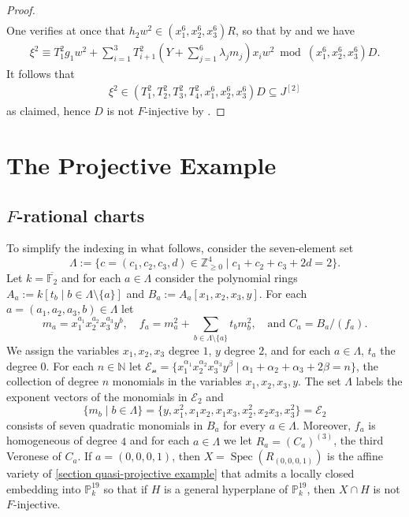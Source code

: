 \documentclass[reqno,11pt]{amsart}
\makeatletter
\numberwithin{equation}{section}
\theoremstyle{definition}
\theoremstyle{definition}
\theoremstyle{definition}
\theoremstyle{remark}
\newcommand{\Spec}{\operatorname{Spec}}
\newcommand{\NN}{\mathbb{N}}
\newcommand{\Z}{\mathbb{Z}}
\newcommand{\F}{\mathbb{F}}
\newcommand{\PP}{\mathbb{P}}
\renewcommand*{\eqref}[1]{%
  \hyperref[{#1}]{\textup{\tagform@{\ref*{#1}}}}%
}
\makeatother
\begin{document}
\begin{proof}
\begin{align*}
\end{align*}
One verifies at once that $h_2 w^2\in (x_1^6,x_2^6,x_3^6)R$, so that by \eqref{eq:xi-h1} and \eqref{eq:i-not-j} we have
\begin{align*}
    \xi^2\equiv T_1^2 g_1w^2+\sum\limits_{i=1}^3 T_{i+1}^2\left(Y+\sum\limits_{j=1}^6 \lambda_j m_j\right)x_i w^2 \bmod (x_1^6,x_2^6,x_3^6)D.
\end{align*}
It follows that
\begin{align*}
    \xi^2\in (T_1^2,T_2^2,T_3^2,T_4^2,x_1^6,x_2^6,x_3^6)D\subseteq J^{[2]}
\end{align*}
as claimed, hence $D$ is not $F$-injective by \cite[Corollary 3.9]{QS17}.
\end{proof}

\section{The Projective Example}\label{sec: projective}


\subsection{\texorpdfstring{$F$}{F}-rational charts}\label{section affine charts}

To simplify the indexing in what follows, consider the seven-element set $$\Lambda:=\{c=(c_1,c_2,c_3,d)\in\Z_{\geq 0}^4\mid c_1+c_2+c_3+2d=2\}.$$ Let $k=\overline{\F_2}$ and for each $a\in \Lambda$ consider the polynomial rings $A_a:=k[t_b\mid b\in \Lambda\setminus\{a\}]$ and $B_a:=A_a[x_1,x_2,x_3,y]$. For each $a=(a_1,a_2,a_3,b)\in \Lambda$ let 
\[
m_a = x_1^{a_1}x_2^{a_2}x_3^{a_3}y^b,\quad f_a = m_a^2 + \sum_{b\in\Lambda\setminus\{a\}}t_bm_b^2,\quad \mbox{and } C_a = B_a/(f_a).
\]
We assign the variables $x_1,x_2,x_3$ degree $1$, $y$ degree $2$, and for each $a\in\Lambda$, $t_a$ the degree $0$. For each $n\in\NN$ let $\mathcal{E_n} = \{x_1^{\alpha_1}x_2^{\alpha_2}x_3^{\alpha_3}y^{\beta}\mid \alpha_1+\alpha_2+\alpha_3+2\beta = n\}$, the collection of degree $n$ monomials in the variables $x_1,x_2,x_3,y$. The set $\Lambda$ labels the exponent vectors of the monomials in $\mathcal{E}_2$ and
\[
\{m_b\mid b\in\Lambda\} = \{y,x_1^2,x_1x_2,x_1x_3,x_2^2,x_2x_3,x_3^2\} = \mathcal{E}_2
\]
consists of seven quadratic monomials in $B_a$ for every $a\in\Lambda$. Moreover, $f_a$ is homogeneous of degree $4$ and for each $a\in\Lambda$ we let $R_a = (C_a)^{(3)}$, the third Veronese of $C_a$. If $a = (0,0,0,1)$, then $X=\Spec(R_{(0,0,0,1)})$ is the affine variety of \cref{section quasi-projective example} that admits a locally closed embedding into $\PP^{19}_k$ so that if $H$ is a general hyperplane of $\PP^{19}_k$, then $X\cap H$ is not $F$-injective. 
\end{document}
